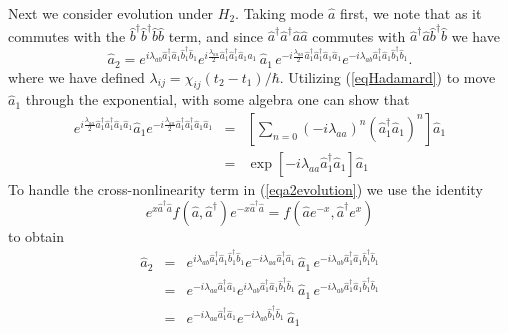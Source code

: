\documentclass[12pt]{iopart}
\begin{document}
Next we consider evolution under $H_2$. Taking mode $\hat{a}$ first, we note that as it commutes with the $\hat{b}^{\dagger} \hat{b}^{\dagger} \hat{b} \hat{b}$ term, and since $\hat{a}^{\dagger} \hat{a}^{\dagger} \hat{a} \hat{a}$ commutes with $\hat{a}^{\dagger} \hat{a} \hat{b}^{\dagger} \hat{b}$ we have
\begin{equation}
\hat{a}_2 = e^{i \lambda_{ab} \hat{a}_1^{\dagger} \hat{a}_1 \hat{b}_1^{\dagger} \hat{b}_1 } 
          e^{ i \frac{\lambda_{aa}} {2} \hat{a}_1^{\dagger} \hat{a}_1^{\dagger} \hat{a}_1 \hat{a}_1}\, \hat{a}_1 \,  
          e^{ -i \frac{\lambda_{aa}}{2} \hat{a}_1^{\dagger} \hat {a}_1^{\dagger} \hat{a}_1 \hat{a}_1 }
          e^{-i \lambda_{ab} \hat{a}_1^{\dagger} \hat{a}_1 \hat{b}_1^{\dagger} \hat{b}_1}.
\label{eqa2evolution}
\end{equation}
where we have defined $\lambda_{ij} = \chi_{ij} (t_2-t_1)/\hbar$. Utilizing (\ref{eqHadamard}) to move $\hat{a}_1$ through the exponential, with some algebra one can show that
\begin{eqnarray}
e^{ i \frac{\lambda_{aa}} {2} \hat{a}_1^{\dagger} \hat{a}_1^{\dagger} \hat{a}_1 \hat{a}_1} \hat{a}_1 
         e^{ -i \frac{\lambda_{aa}} {2} \hat{a}_1^{\dagger} \hat{a}_1^{\dagger} \hat{a}_1 \hat{a}_1} &=& \left[ \sum_{n=0} (-i \lambda_{aa})^n (\hat{a}_1^{\dagger} \hat{a}_1)^n \right] \hat{a}_1 \nonumber \nonumber \\
   &=& \exp[-i \lambda_{aa} \hat{a}_1^{\dagger} \hat{a}_1] \hat{a}_1
\end{eqnarray}
To handle the cross-nonlinearity term in (\ref{eqa2evolution}) we use the identity \cite{louisell}
\begin{equation}
e^{x \hat{a}^{\dagger} \hat{a}} f(\hat{a}, \hat{a}^{\dagger}) e^{-x \hat{a}^{\dagger} \hat{a}} = f(\hat{a}e^{-x}, \hat{a}^{\dagger} e^{x})
\label{eqefeidentity}
\end{equation}
to obtain
\begin{eqnarray}
\hat{a}_2 &=& e^{i \lambda_{ab} \hat{a}_1^{\dagger} \hat{a}_1 \hat{b}_1^{\dagger} \hat{b}_1 } 
          e^{-i \lambda_{aa} \hat{a}_1^{\dagger} \hat{a}_1} \, \hat{a}_1 \,
          e^{-i \lambda_{ab} \hat{a}_1^{\dagger} \hat{a}_1 \hat{b}_1^{\dagger} \hat{b}_1} \nonumber \\
%
          &=& e^{-i \lambda_{aa} \hat{a}_1^{\dagger} \hat{a}_1} 
              e^{i \lambda_{ab} \hat{a}_1^{\dagger} \hat{a}_1 \hat{b}_1^{\dagger} \hat{b}_1 } \, \hat{a}_1 \,
          e^{-i \lambda_{ab} \hat{a}_1^{\dagger} \hat{a}_1 \hat{b}_1^{\dagger} \hat{b}_1} \nonumber \\
%
          &=& e^{-i \lambda_{aa} \hat{a}_1^{\dagger} \hat{a}_1} e^{-i \lambda_{ab} \hat{b}_1^{\dagger} \hat{b}_1} \, \hat{a}_1
\label{eqa2}
\end{eqnarray}
\end{document}
